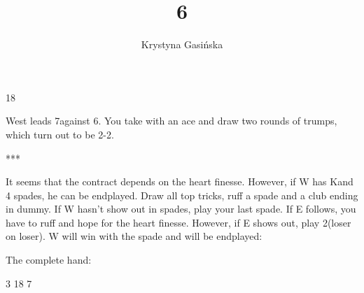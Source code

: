\documentclass[12pt, a4paper]{article}
\title{6\diams}
\author{Krystyna Gasińska}
\begin{document}
\maketitle

        {}{}
        {}{18}
        {}{}
        {}

West leads 7\clubs against 6\diams. You take with
an ace and draw two rounds of trumps, which turn out
to be 2-2.
\begin{center}
    ***
\end{center}
It seems that the contract depends on the 
heart finesse. However, if W has K\hearts and 
4 spades, he can be endplayed. Draw all 
\twosuit{\spades}{\clubs} top tricks, ruff a 
spade and a club ending in dummy. If W hasn't show
out in spades, play your last spade. If E follows,
you have to ruff and hope for the heart finesse.
However, if E shows out, play 2\hearts (loser on loser).
W will win with the spade and will be endplayed:
        {}{}
        {}{}
        {}{}
        {}

\vspace{0.2cm}

The complete hand:

        {}{3}
        {}{18}
        {}{7}
        {}
\end{document}
